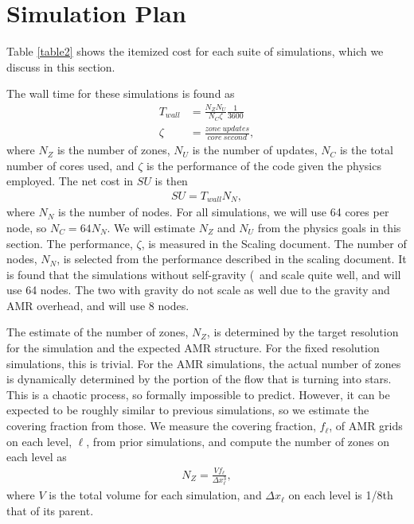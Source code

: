 \section{Simulation Plan}
\label{sec.plan}



Table \ref{table2} shows the itemized cost for each suite of simulations, which
we discuss in this section.

The wall time for these simulations is found as
\begin{align}
    T_{wall} &= \frac{N_Z N_U}{N_C \zeta} \frac{1}{3600}\label{eqn.twall}\\
    \zeta &= \frac{zone\ updates}{core\ second},
\end{align}
where $N_Z$ is the number of zones, $N_U$ is the number of updates, $N_C$ is the
total number of cores used, and $\zeta$ is the performance of the code given the
physics employed.  The net cost in $SU$ is then
\begin{align}
    SU = T_{wall} N_N, \label{eqn.su}
\end{align}
where $N_N$ is the number of nodes.  For all simulations, we will use 64 cores
per node, so $N_C=64 N_N$.  We will estimate $N_Z$ and $N_U$ from the physics
goals in this section.  The performance, $\zeta$, is measured in the Scaling
document.  The number of nodes, $N_N$, is selected from the performance
described in the scaling document.  It is found that the simulations without
self-gravity (\nameCMB\ and \nameTurbulence\) scale quite well, and will use 64
nodes.  The two with gravity do not scale as well due to the gravity and AMR
overhead, and will use 8 nodes.

The estimate of the number of zones, $N_Z$,
is determined by the target resolution for the simulation and the expected AMR
structure.  For the fixed
resolution simulations, this is trivial.  
For the AMR
simulations, the actual number of zones  
 is dynamically determined by the portion of the flow
that is turning into stars.  
This is a chaotic process, so formally impossible
to predict.
However, it can be expected to be roughly similar to
previous simulations, so we estimate the covering fraction from those.   
We measure the covering fraction, $f_\ell$, of AMR grids on each level, $\ell$,
from prior simulations, and compute the number of zones on each level as
\begin{align}
    N_Z = \frac{V f_\ell}{\Delta x_\ell^3},
\end{align}
where $V$ is the total volume for each simulation, and $\Delta x_\ell$ on each level is 1/8th that of its parent.

